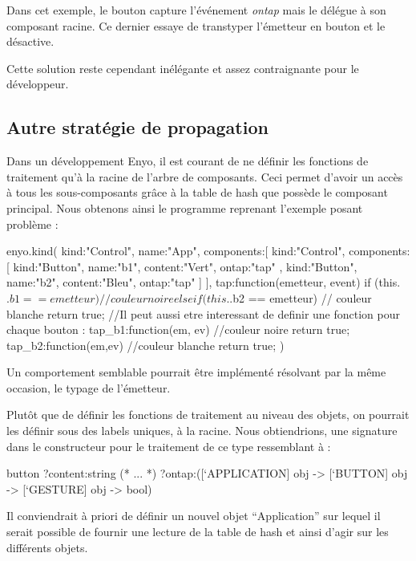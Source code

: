 Dans cet exemple, le bouton capture l'événement \emph{ontap} mais le délégue
à son composant racine. Ce dernier essaye de transtyper l'émetteur en bouton
et le désactive.

Cette solution reste cependant inélégante et assez contraignante pour le développeur.

\subsection{Autre stratégie de propagation}\label{sub:event_amel}

Dans un développement Enyo, il est courant de ne définir les fonctions de traitement qu'à la racine de l'arbre
de composants. Ceci permet d'avoir un accès à tous les sous-composants grâce à la table de hash que possède
le composant principal. Nous obtenons ainsi le programme reprenant l'exemple posant problème :
\begin{JavaScript}
  enyo.kind({
    kind:"Control",
    name:"App",
    components:[
      {
        kind:"Control",
        components:[
          {kind:"Button", name:"b1", content:"Vert",
            ontap:"tap"
          },
          {kind:"Button", name:"b2", content:"Bleu",         
            ontap:"tap"
          }
        ]
      }
    ],
    tap:function(emetteur, event){
      if (this.$.b1 == emetteur){
        // couleur noire
      } else if (this.$.b2 == emetteur){
        // couleur blanche 
      }
      return true;
    }
    //Il peut aussi etre interessant de definir une fonction pour chaque bouton :
    tap_b1:function(em, ev){ 
      //couleur noire
      return true;
    }
    tap_b2:function(em,ev){
      //couleur blanche
      return true;
    }
})
\end{JavaScript}

Un comportement semblable pourrait être implémenté résolvant par la même occasion, le typage de l'émetteur.

Plutôt que de définir les fonctions de traitement au niveau des objets, on pourrait les définir
sous des labels uniques, à la racine. Nous obtiendrions, une signature dans le constructeur
pour le traitement de ce type ressemblant à :
\begin{OCaml}
  button ?content:string
         (* ... *)
         ?ontap:([`APPLICATION] obj -> 
                 [`BUTTON] obj -> 
                 [`GESTURE] obj -> bool)
\end{OCaml}

Il conviendrait à priori de définir un nouvel objet ``Application'' sur lequel il serait possible de
fournir une lecture de la table de hash et ainsi d'agir sur les différents objets.

